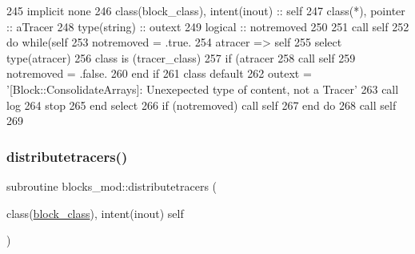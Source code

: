 \begin{DoxyCode}
245     \textcolor{keywordtype}{implicit none}
246     \textcolor{keywordtype}{class}(block\_class), \textcolor{keywordtype}{intent(inout)} :: self
247     \textcolor{keywordtype}{class}(*), \textcolor{keywordtype}{pointer} :: aTracer
248     \textcolor{keywordtype}{type}(string) :: outext
249     \textcolor{keywordtype}{logical} :: notremoved
250     
251     \textcolor{keyword}{call }self%
252     \textcolor{keywordflow}{do} \textcolor{keywordflow}{while}(self%
253         notremoved = .true.
254         atracer => self%
255         \textcolor{keywordflow}{select type}(atracer)
256 \textcolor{keywordflow}{        class is} (tracer\_class)
257             \textcolor{keywordflow}{if} (atracer%
258                 \textcolor{keyword}{call }self%
259                 notremoved = .false.                
260 \textcolor{keywordflow}{            end if}
261 \textcolor{keywordflow}{            class default}
262             outext = \textcolor{stringliteral}{'[Block::ConsolidateArrays]: Unexepected type of content, not a Tracer'}
263             \textcolor{keyword}{call }log%
264             stop
265 \textcolor{keywordflow}{        end select}
266         \textcolor{keywordflow}{if} (notremoved) \textcolor{keyword}{call }self%
267 \textcolor{keywordflow}{    end do}
268     \textcolor{keyword}{call }self%
269     
\end{DoxyCode}
\mbox{\label{namespaceblocks__mod_aa178415bcc40cf169744d356e1a09c6b}} 
\subsubsection{\texorpdfstring{distributetracers()}{distributetracers()}}
{\footnotesize\ttfamily subroutine blocks\+\_\+mod\+::distributetracers (\begin{DoxyParamCaption}\item[{class(\mbox{\hyperlink{structblocks__mod_1_1block__class}{block\+\_\+class}}), intent(inout)}]{self }\end{DoxyParamCaption})\hspace{0.3cm}{\ttfamily [private]}}



